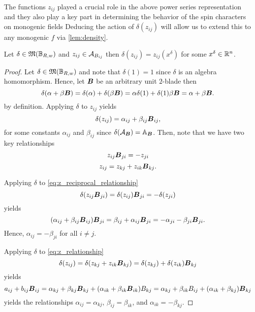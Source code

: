 The functions $z_{ij}$ played a crucial role in the above power series representation and they also play a key part in determining the behavior of the spin characters on monogenic fields  Deducing the action of $\delta(z_{ij})$ will allow us to extend this to any monogenic $f$ via \cref{lem:density}. 

\begin{lemma}
Let $\delta \in \mathfrak{M}(\mathbb{B}_{R,w})$ and $z_{ij} \in \mathcal{A}_{B_{ij}}$ then $\delta(z_{ij})=z_{ij}(x^\delta)$ for some $x^\delta \in \mathbb{R}^n$.
\end{lemma}
\begin{proof}
Let $\delta \in \mathfrak{M}(\mathbb{B}_{R,w})$ and note that $\delta(1)=1$ since $\delta$ is an algebra homomorphism. Hence, let $\boldsymbol{B}$ be an arbitrary unit $2$-blade then 
\begin{equation}
\delta(\alpha + \beta \boldsymbol{B}) = \delta(\alpha) + \delta(\beta \boldsymbol{B})=\alpha \delta(1) + \delta(1)\beta \boldsymbol{B} = \alpha + \beta \boldsymbol{B}.
\end{equation}
by definition. Applying $\delta$ to $z_{ij}$ yields
\begin{equation}
\delta(z_{ij}) = \alpha_{ij} + \beta_{ij} \boldsymbol{B}_{ij},
\end{equation}
for some constants $\alpha_{ij}$ and $\beta_{ij}$ since $\delta(\mathcal{A}_{\boldsymbol{B}})=\mathbb{A}_{\boldsymbol{B}}$. Then, note that we have two key relationships
\begin{equation}
\label{eq:z_reciprocal_relationship}
z_{ij} \boldsymbol{B}_{ji}  = -z_{ji}
\end{equation}
\begin{equation}
\label{eq:z_relationship}
z_{ij} = z_{kj} + z_{ik} \boldsymbol{B}_{kj}.
\end{equation}

Applying $\delta$ to \cref{eq:z_reciprocal_relationship}
\begin{equation}
\delta(z_{ij} \boldsymbol{B}_{ji}) = \delta(z_{ij}) \boldsymbol{B}_{ji} = -\delta(z_{ji})
\end{equation}
yields
\begin{equation}
(\alpha_{ij} + \beta_{ij} \boldsymbol{B}_{ij})\boldsymbol{B}_{ji} = \beta_{ij}+\alpha_{ij}\boldsymbol{B}_{ji} = - \alpha_{ji} - \beta_{ji} \boldsymbol{B}_{ji}.
\end{equation}
Hence, $\alpha_{ij} = -\beta_{ji}$ for all $i \neq j$.

Applying $\delta$ to \cref{eq:z_relationship}
\begin{equation}
\delta(z_{ij}) = \delta(z_{kj} + z_{ik} \boldsymbol{B}_{kj}) = \delta(z_{kj})+\delta(z_{ik})\boldsymbol{B}_{kj}
\end{equation}
yields
\begin{equation}
a_{ij} + b_{ij} \boldsymbol{B}_{ij} = \alpha_{kj} + \beta_{kj} \boldsymbol{B}_{kj} + (\alpha_{ik} + \beta_{ik} \boldsymbol{B}_{ik})B_{kj} = \alpha_{kj} + \beta_{ik} B_{ij} + (\alpha_{ik} + \beta_{kj})\boldsymbol{B}_{kj}
\end{equation}
yields the relationships $\alpha_{ij} = \alpha_{kj}$, $\beta_{ij} = \beta_{ik}$, and $\alpha_{ik}=-\beta_{kj}$.


\end{proof}
